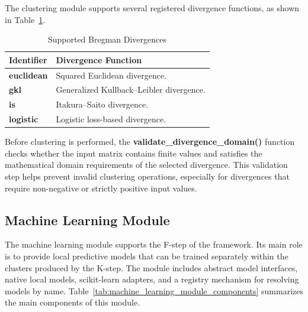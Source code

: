 The clustering module supports several registered divergence functions, as shown in Table~\ref{tab:supported_bregman_divergences}.

\begin{table}[H]
      \centering
      \caption{Supported Bregman Divergences}
      \label{tab:supported_bregman_divergences}
      \renewcommand{\arraystretch}{1.2}
      \begin{tabularx}{\textwidth}{
                  >{\raggedright\arraybackslash}p{3.5cm}
                  >{\raggedright\arraybackslash}X
            }
            \toprule
            \textbf{Identifier} & \textbf{Divergence Function} \\
            \midrule
            \textbf{euclidean}  &
            Squared Euclidean divergence.                      \\

            \textbf{gkl}        &
            Generalized Kullback--Leibler divergence.          \\

            \textbf{is}         &
            Itakura--Saito divergence.                         \\

            \textbf{logistic}   &
            Logistic loss-based divergence.                    \\
            \bottomrule
      \end{tabularx}
\end{table}

Before clustering is performed, the \textbf{validate\_divergence\_domain()} function checks whether the input matrix contains finite values and satisfies the mathematical domain requirements of the selected divergence. This validation step helps prevent invalid clustering operations, especially for divergences that require non-negative or strictly positive input values.

\subsection{Machine Learning Module}

\hs The machine learning module supports the F-step of the \KFCProcedure{} framework. Its main role is to provide local predictive models that can be trained separately within the clusters produced by the K-step. The module includes abstract model interfaces, native local models, scikit-learn adapters, and a registry mechanism for resolving models by name. Table~\ref{tab:machine_learning_module_components} summarizes the main components of this module.

